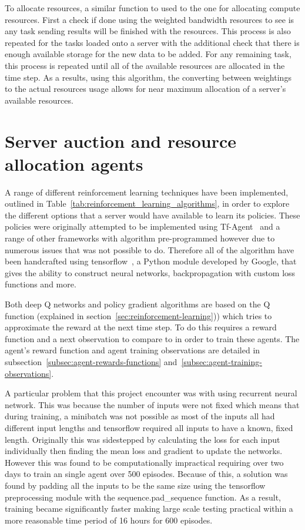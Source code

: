 To allocate resources, a similar function to used to the one for allocating compute resources. First a check if done
using the weighted bandwidth resources to see is any task sending results will be finished with the resources.
This process is also repeated for the tasks loaded onto a server with the additional check that there is enough
available storage for the new data to be added. For any remaining task, this process is repeated until all of the
available resources are allocated in the time step. As a results, using this algorithm, the converting between
weightings to the actual resources usage allows for near maximum allocation of a server's available resources.

\section{Server auction and resource allocation agents}\label{sec:implementing-auction-and-resource-allocation-agents}

A range of different reinforcement learning techniques have been implemented, outlined in
Table~\ref{tab:reinforcement_learning_algorithms}, in order to explore the different options that a server would have
available to learn its policies. These policies were originally attempted to be implemented using
Tf-Agent~\citep{tf-agent} and a range of other frameworks with algorithm pre-programmed however due to numerous issues
that was not possible to do. Therefore all of the algorithm have been handcrafted using
tensorflow~\citep{tensorflow2015-whitepaper}, a Python module developed by Google, that gives the ability to construct
neural networks, backpropagation with custom loss functions and more.

Both deep Q networks and policy gradient algorithms are based on the Q function (explained in
section~\ref{sec:reinforcement-learning})) which tries to approximate the reward at the next time step. To do
this requires a reward function and a next observation to compare to in order to train these agents. The agent's
reward function and agent training observations are detailed in subsection~\ref{subsec:agent-rewards-functions}
and~\ref{subsec:agent-training-observations}.

A particular problem that this project encounter was with using recurrent neural network. This was because the
number of inputs were not fixed which means that during training, a minibatch was not possible as most of the inputs
all had different input lengths and tensorflow required all inputs to have a known, fixed length. Originally this was
sidestepped by calculating the loss for each input individually then finding the mean loss and gradient to update the
networks. However this was found to be computationally impractical requiring over two days to train an single agent
over 500 episodes. Because of this, a solution was found by padding all the inputs to be the same size using the
tensorflow preprocessing module with the sequence.pad\_sequence function. As a result, training became significantly
faster making large scale testing practical within a more reasonable time period of 16 hours for 600 episodes.

